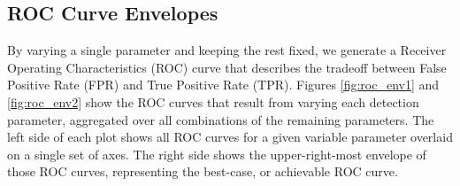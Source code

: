 \subsection{ROC Curve Envelopes}
By varying a single parameter and keeping the rest fixed, we generate a Receiver
Operating Characteristics (ROC) curve that describes the tradeoff between False
Positive Rate (FPR) and True Positive Rate (TPR). Figures \ref{fig:roc_env1} and
\ref{fig:roc_env2} show the ROC curves that result from varying each detection
parameter, aggregated over all combinations of the remaining parameters. The
left side of each plot shows all ROC curves for a given variable parameter
overlaid on a single set of axes. The right side shows the upper-right-most
envelope of those ROC curves, representing the best-case, or achievable ROC
curve.
